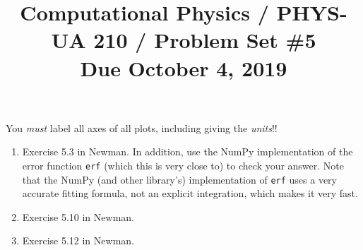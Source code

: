 \documentclass[11pt, preprint]{aastex}
\begin{document}
\title{\bf Computational Physics / PHYS-UA 210 / Problem Set \#5
\\ Due October 4, 2019 }

You {\it must} label all axes of all plots, including giving the {\it
  units}!!

\begin{enumerate}
  \item Exercise 5.3 in Newman. In addition, use the NumPy
    implementation of the error function {\tt erf} (which this is
    very close to) to check your answer. Note that the NumPy (and
    other library's) implementation of {\tt erf} uses a very accurate
    fitting formula, not an explicit integration, which makes it very
    fast.
  \item Exercise 5.10 in Newman. 
  \item Exercise 5.12 in Newman. 
\end{enumerate}
\end{document}
